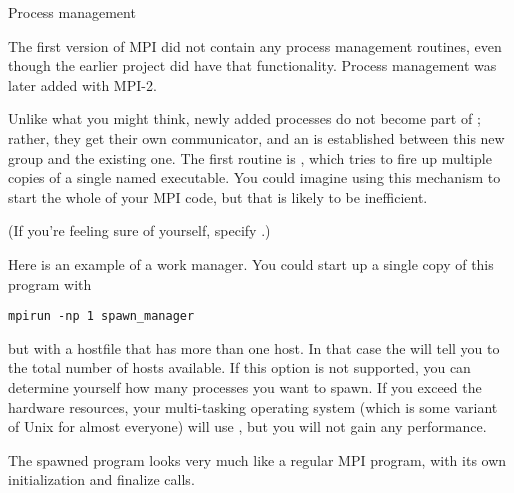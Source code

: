 
 {Process management}
\label{sec:mpi-dynamic}

The first version of MPI did not contain any process management
routines, even though the earlier  project did have
that functionality. Process management was later added with MPI-2.

Unlike what you might think, newly added processes do not become part
of ; rather, they get their own communicator, and an
 is established between this new group
and the existing one. The first routine is
, which tries to fire up multiple copies
of a single named executable. You could imagine using this mechanism
to start the whole of your MPI code, but that is likely to be inefficient.


(If you're feeling sure of yourself, specify .)

Here is an example of a work manager.
%
%
%
You could start up a single copy of this program with 
\begin{verbatim}
mpirun -np 1 spawn_manager
\end{verbatim}
but with a hostfile that has more than one host. In that case the 
will tell you to the total number of hosts available. If this option
is not supported, you can determine yourself how many processes you
want to spawn. If you exceed the hardware resources, your
multi-tasking operating system (which is some variant of Unix for
almost everyone) will use , but you will not
gain any performance.

The spawned program looks very much like a regular MPI program, with
its own initialization and finalize calls.

%

